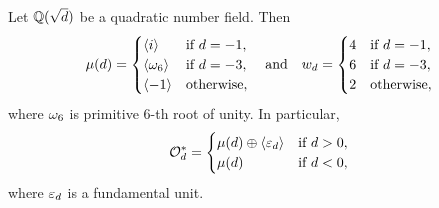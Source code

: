     \begin{proposition}\label{prop:unit_group_quadratic}
      Let $\mathbb{Q}(\sqrt{d})$ be a quadratic number field. Then
      \[
        \mu(d) = \begin{cases} \langle i\rangle & \text{if $d = -1$}, \\ \langle\omega_{6}\rangle & \text{if $d = -3$}, \\ \langle-1\rangle & \text{otherwise}, \end{cases} \quad \text{and} \quad w_{d} = \begin{cases} 4 & \text{if $d = -1$}, \\ 6 & \text{if $d = -3$}, \\ 2 & \text{otherwise}, \end{cases}
      \]
      where $\omega_{6}$ is primitive $6$-th root of unity. In particular,
      \[
        \mathcal{O}_{d}^{\ast} = \begin{cases} \mu(d) \oplus \langle\varepsilon_{d}\rangle & \text{if $d > 0$}, \\ \mu(d) & \text{if $d < 0$}, \end{cases}
      \]
      where $\varepsilon_{d}$ is a fundamental unit.
    \end{proposition}
